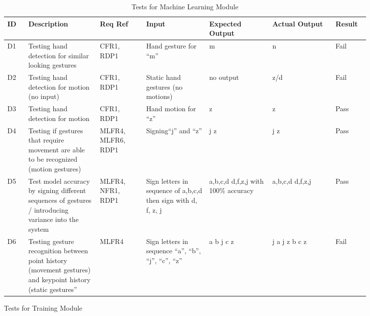 \documentclass[12pt, titlepage]{article}
\begin{document}
\renewcommand{\arraystretch}{1.2}
\noindent \begin{longtable}{p{0.05\linewidth}|p{0.17\linewidth}|p{0.11\linewidth}|p{0.15\linewidth}|p{0.15\linewidth}|p{0.15\linewidth}|p{0.08\linewidth}}
\hline
\textbf{ID} & \textbf{Description} & \textbf{Req Ref} & \textbf{Input} & \textbf{Expected Output} & \textbf{Actual Output} & \textbf{Result}\\
\hline
D1 & Testing hand detection for similar looking gestures & CFR1, RDP1 & Hand gesture for “m” & m & n & Fail\\ \hline
D2 & Testing hand detection for motion (no input) & CFR1, RDP1 & Static hand gestures (no motions) & no output & z/d & Fail\\ \hline
D3 & Testing hand detection for motion & CFR1, RDP1 & Hand motion for “z” & z & z & Pass\\ \hline
D4 & Testing if gestures that require movement are able to be recognized (motion gestures) & MLFR4, MLFR6, RDP1 & Signing“j” and “z” & j z & j z & Pass\\ \hline
D5 & Test model accuracy by signing different sequences of gestures / introducing variance into the system & MLFR4, NFR1, RDP1 & Sign letters in sequence of a,b,c,d then sign with d, f, z, j & a,b,c,d
d,f,z,j
with 100\% accuracy
 & a,b,c,d
d,f,z,j
 & Pass\\ \hline
D6 & Testing gesture recognition between point history (movement gestures) and keypoint history (static gestures” & MLFR4 & Sign letters in sequence “a”, “b”, “j”, “c”, “z” & a b j c z & j a j z b c z & Fail
\hline
\caption{Tests for Machine Learning Module}
\end{longtable}

\newpage
\centerline{Tests for Training Module}
\end{document}
